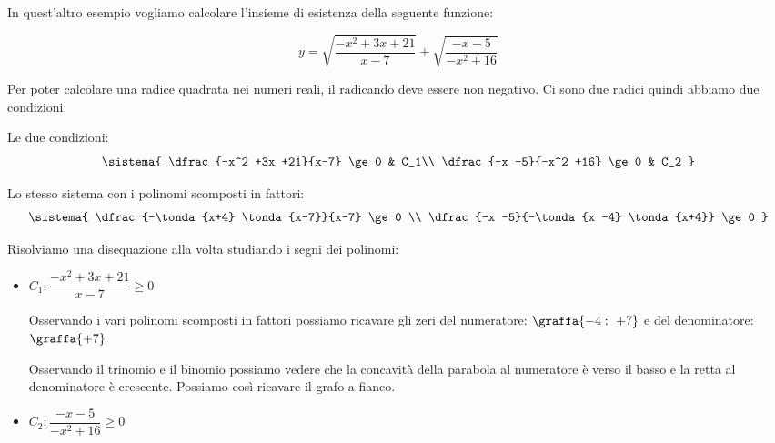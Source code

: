 \begin{esempio}
 
In quest'altro esempio vogliamo calcolare l'insieme di esistenza della 
seguente funzione:

\[y = \sqrt{\dfrac{-x^2 +3x +21}{x-7}} + \sqrt{\dfrac{-x -5}{-x^2 +16}}
\]

Per poter calcolare una radice quadrata nei numeri reali, il radicando deve 
essere non negativo. Ci sono due radici quindi abbiamo due condizioni:

\begin{minipage}{.49 \linewidth}
Le due condizioni:
 \[\sistema{
    \dfrac{-x^2 +3x +21}{x-7} \ge 0 & C_1\\
    \dfrac{-x -5}{-x^2 +16} \ge 0 & C_2
  }
\]
\end{minipage}
\begin{minipage}{.49 \linewidth}
Lo stesso sistema con i polinomi scomposti in fattori:
\[\sistema{
    \dfrac{-\tonda{x+4} \tonda{x-7}}{x-7} \ge 0 \\
    \dfrac{-x -5}{-\tonda{x -4} \tonda{x+4}} \ge 0
  }
\]
\end{minipage}

Risolviamo una disequazione alla volta studiando i segni dei polinomi:

\begin{itemize}
 \item \(C_1: \dfrac{-x^2 +3x +21}{x-7} \ge 0\)

Osservando i vari polinomi scomposti in fattori possiamo ricavare gli zeri 
del numeratore: \(\graffa{-4:~+7}\) e del denominatore: \(\graffa{+7}\)

\begin{minipage}{.49\textwidth}
Osservando il trinomio e il binomio possiamo vedere che la concavità della 
parabola al numeratore è verso il basso e la retta al 
denominatore è crescente. Possiamo così ricavare il grafo a fianco.
\end{minipage}
\hfill
\begin{minipage}{.49\textwidth}
\begin{center} \segnosistemaba \end{center}
\end{minipage}


 \item \(C_2: \dfrac{-x -5}{-x^2 +16} \ge 0\)


\end{itemize}
\end{esempio}
